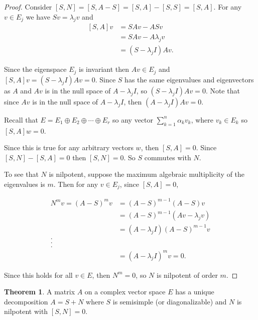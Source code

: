 \documentclass[12pt]{article}
\theoremstyle{definition}
\newtheorem{theorem}{Theorem}[section]  %
\begin{document}
\begin{proof}
Consider $[S,N] = [S, A-S] = [S, A] - [S, S] = [S, A]$. For any $v \in E_j$ we have $Sv = \lambda_j v$
and 
\begin{equation*}
\begin{split}
[S, A] v &= SAv - ASv \\
&= SAv - A\lambda_j v \\
&= (S - \lambda_j I) A v.
\end{split}
\end{equation*}

Since the eigenspace $E_j$ is invariant then $Av \in E_j$ and $[S, A] v = (S - \lambda_j I) Av = 0$. Since
$S$ has the same eigenvalues and eigenvectors as $A$ and $Av$ is in the null space of $A - \lambda_j I$, so
$(S - \lambda_j I) Av = 0$. Note that since $Av$ is in the null space of $A - \lambda_j I$, then
$(A - \lambda_j I) Av = 0$.

Recall that $ E = E_1 \oplus E_2 \oplus \cdots \oplus E_r$ so any vector
$\displaystyle \sum_{k = 1}^{n} \alpha_k v_k$, where $v_k \in E_k$ so $[S, A] w = 0$.

Since this is true for any arbitrary vectors $w$, then $[S, A] = 0$. Since $[S, N] - [S, A] = 0$ then
$[S, N] = 0$. So $S$ commutes with $N$.

To see that $N$ is nilpotent, suppose the maximum algebraic multiplicity of the eigenvalues is $m$. Then
for any $v \in E_j$, since $[S, A] = 0$,

\begin{equation*}
\begin{split}
N^m v = (A-S)^m v &= (A - S)^{m-1} (A - S)v \\
&= (A- S)^{m-1} (Av - \lambda_j v) \\
&= (A - \lambda_j I) (A - S)^{m-1} v \\
. \\
. \\
. \\
&= (A - \lambda_j I)^m v = 0.
\end{split}
\end{equation*}

Since this holds for all $v \in E$, then $N^m = 0$, so $N$ is nilpotent of order $m$.
\end{proof}

\begin{theorem}
A matrix $A$ on a complex vector space $E$ has a unique decomposition $A = S + N$ where $S$
is semisimple (or diagonalizable) and $N$ is nilpotent with $[S, N] = 0$.
\end{theorem}
\end{document}
